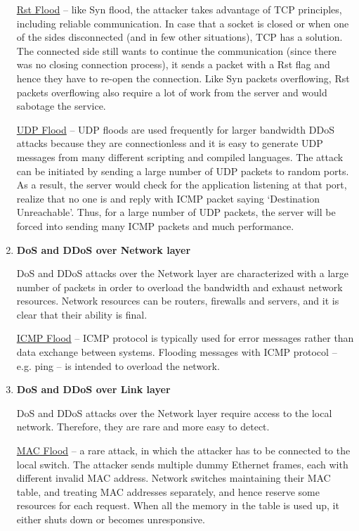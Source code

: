 \documentclass{article}
\begin{document}
\begin{enumerate}
 \hfill \break \underline{Rst Flood} – like Syn flood, the attacker takes advantage of TCP principles, including reliable communication. In case that a socket is closed or when one of the sides disconnected (and in few other situations), TCP has a solution. The connected side still wants to continue the communication (since there was no closing connection process), it sends a packet with a Rst flag and hence they have to re-open the connection. Like Syn packets overflowing, Rst packets overflowing also require a lot of work from the server and would sabotage the service.

 \hfill \break \underline{UDP Flood} – UDP floods are used frequently for larger bandwidth DDoS attacks because they are connectionless and it is easy to generate UDP messages from many different scripting and compiled languages. The attack can be initiated by sending a large number of UDP packets to random ports. As a result, the server would check for the application listening at that port, realize that no one is and reply with ICMP packet saying ‘Destination Unreachable’. Thus, for a large number of UDP packets, the server will be forced into sending many ICMP packets and much performance.

\item \textbf{DoS and DDoS over Network layer} 

 \hfill \break DoS and DDoS attacks over the Network layer are characterized with a large number of packets in order to overload the bandwidth and exhaust network resources. Network resources can be routers, firewalls and servers, and it is clear that their ability is final.

 \hfill \break \underline{ICMP Flood} – ICMP protocol is typically used for error messages rather than data exchange between systems. Flooding messages with ICMP protocol – e.g. ping – is intended to overload the network.


\item \textbf{DoS and DDoS over Link layer}  

 \hfill \break DoS and DDoS attacks over the Network layer require access to the local network. Therefore, they are rare and more easy to detect.

 \hfill \break \underline{MAC Flood} – a rare attack, in which the attacker has to be connected to the local switch. The attacker sends multiple dummy Ethernet frames, each with different invalid MAC address. Network switches maintaining their MAC table, and treating MAC addresses separately, and hence reserve some resources for each request. When all the memory in the table is used up, it either shuts down or becomes unresponsive.

\end{enumerate}
\end{document}
